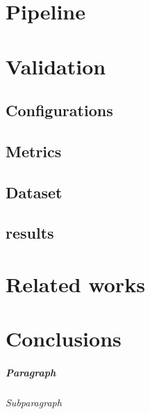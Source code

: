 \chapter{Pipeline}
\chapter{Validation}
\section{Configurations}
\section{Metrics}
\section{Dataset}
\section{results}
\chapter{Related works}
\chapter{Conclusions}


\paragraph{Paragraph}
\subparagraph{Subparagraph}